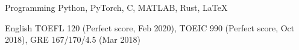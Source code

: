 

\begin{cvskills}

  \cvskill
    {Programming} %
    {Python, PyTorch, C, MATLAB, Rust, LaTeX} %

  \cvskill
    {English} %
    {TOEFL 120 (Perfect score, Feb 2020), TOEIC 990 (Perfect score, Oct 2018), GRE 167/170/4.5 (Mar 2018)} %

\end{cvskills}
